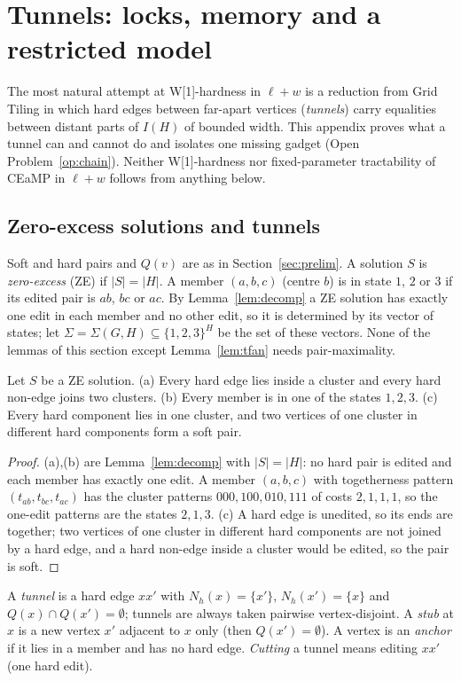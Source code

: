 \section{Tunnels: locks, memory and a restricted model}\label{app:tunnels}\label{sec:tunnels}
The most natural attempt at W[1]-hardness in $\ell+w$ is a reduction from Grid Tiling in which hard edges between far-apart vertices (\emph{tunnels}) carry equalities between distant parts of $I(H)$ of bounded width. This appendix proves what a tunnel can and cannot do and isolates one missing gadget (Open Problem~\ref{op:chain}). Neither W[1]-hardness nor fixed-parameter tractability of CEaMP in $\ell+w$ follows from anything below.

\subsection{Zero-excess solutions and tunnels}
Soft and hard pairs and $Q(v)$ are as in Section~\ref{sec:prelim}. A solution $S$ is \emph{zero-excess} (ZE) if $|S|=|H|$. A member $(a,b,c)$ (centre $b$) is in state $1$, $2$ or $3$ if its edited pair is $ab$, $bc$ or $ac$. By Lemma~\ref{lem:decomp} a ZE solution has exactly one edit in each member and no other edit, so it is determined by its vector of states; let $\Sigma=\Sigma(G,H)\subseteq\{1,2,3\}^H$ be the set of these vectors. None of the lemmas of this section except Lemma~\ref{lem:tfan} needs pair-maximality.

\begin{lemma}\label{lem:tZE}
Let $S$ be a ZE solution. (a) Every hard edge lies inside a cluster and every hard non-edge joins two clusters. (b) Every member is in one of the states $1,2,3$. (c) Every hard component lies in one cluster, and two vertices of one cluster in different hard components form a soft pair.
\end{lemma}
\begin{proof}
(a),(b) are Lemma~\ref{lem:decomp} with $|S|=|H|$: no hard pair is edited and each member has exactly one edit. A member $(a,b,c)$ with togetherness pattern $(t_{ab},t_{bc},t_{ac})$ has the cluster patterns $000,100,010,111$ of costs $2,1,1,1$, so the one-edit patterns are the states $2,1,3$. (c) A hard edge is unedited, so its ends are together; two vertices of one cluster in different hard components are not joined by a hard edge, and a hard non-edge inside a cluster would be edited, so the pair is soft.
\end{proof}

A \emph{tunnel} is a hard edge $xx'$ with $N_h(x)=\{x'\}$, $N_h(x')=\{x\}$ and $Q(x)\cap Q(x')=\emptyset$; tunnels are always taken pairwise vertex-disjoint. A \emph{stub} at $x$ is a new vertex $x'$ adjacent to $x$ only (then $Q(x')=\emptyset$). A vertex is an \emph{anchor} if it lies in a member and has no hard edge. \emph{Cutting} a tunnel means editing $xx'$ (one hard edit).

